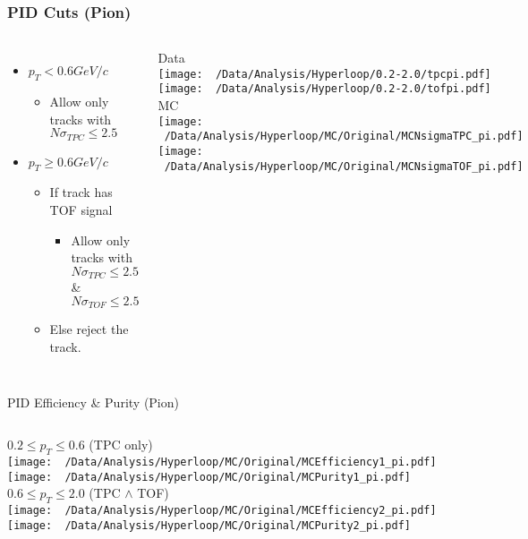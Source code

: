\documentclass{beamer}
\begin{document}
\begin{frame}
	\frametitle{PID Cuts (Pion)}
	\begin{columns}
			\begin{itemize}
				\item $p_T<0.6GeV/c$
				\begin{itemize}
					\item Allow only tracks with $N\sigma_{TPC} \leq 2.5$
				\end{itemize}
				\item $p_T\geq 0.6GeV/c$
				\begin{itemize}
					\item If track has TOF signal
					\begin{itemize}
						\item Allow  only tracks with $N\sigma_{TPC} \leq 2.5$ \& $N\sigma_{TOF}\leq 2.5$
					\end{itemize}
					\item Else reject the track.
				\end{itemize}
			\end{itemize}
		\centering
		{\tiny Data}\\
		\texttt{[image: ~/Data/Analysis/Hyperloop/0.2-2.0/tpcpi.pdf]}\\
		\texttt{[image: ~/Data/Analysis/Hyperloop/0.2-2.0/tofpi.pdf]}\\
		{\tiny MC}\\
		\texttt{[image: ~/Data/Analysis/Hyperloop/MC/Original/MCNsigmaTPC\_pi.pdf]}\\
		\texttt{[image: ~/Data/Analysis/Hyperloop/MC/Original/MCNsigmaTOF\_pi.pdf]}\\
	\end{columns}
\end{frame}
\begin{frame}{PID Efficiency \& Purity (Pion)}
	\begin{columns}
		\centering
		$0.2\leq p_T \leq 0.6$ (TPC only)\\
		\texttt{[image: ~/Data/Analysis/Hyperloop/MC/Original/MCEfficiency1\_pi.pdf]}\\
		\texttt{[image: ~/Data/Analysis/Hyperloop/MC/Original/MCPurity1\_pi.pdf]}
		\centering
		$0.6\leq p_T \leq 2.0$ (TPC $\land$ TOF)\\
		\texttt{[image: ~/Data/Analysis/Hyperloop/MC/Original/MCEfficiency2\_pi.pdf]}\\
		\texttt{[image: ~/Data/Analysis/Hyperloop/MC/Original/MCPurity2\_pi.pdf]}
	\end{columns}
\end{frame}
\end{document}
